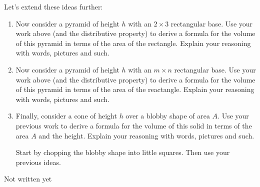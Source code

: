 \documentclass[nooutcomes,noauthor,handout,hints,12pt]{ximera}
\begin{document}
\begin{question}
  Let's extend these ideas further:
  \begin{enumerate}
  \item Now consider a pyramid of height $h$ with an $2\times 3$
    rectangular base. Use your work above (and the distributive
    property) to derive a formula for the volume of this
    pyramid in terms of the area of the rectangle. Explain your reasoning with words, pictures and such.
    \item Now consider a pyramid of height $h$ with an $m\times n$
    rectangular base. Use your work above (and the distributive
    property) to derive a formula for the volume of this
    pyramid in terms of the area of the reactangle. Explain your reasoning with words, pictures and such.
  \item Finally, consider a cone of height $h$ over a blobby shape of
    area $A$. Use your previous work to derive a formula for the
    volume of this solid in terms of the area $A$ and the height. Explain your reasoning with words, pictures and such.
    \begin{hint}
      Start by chopping the blobby shape into little squares. Then use your previous ideas.
    \end{hint}
  \end{enumerate}
    \begin{freeResponse}
Not written yet
    \end{freeResponse}
\end{question}
\end{document}
